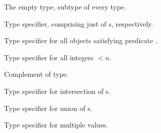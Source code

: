 \begin{LIST}{1cm}
  \IT{\NIL}
  {
  The empty type, subtype of every type.
  }

  {
  Type specifier, comprising just  of s, respectively.
  }

  {
  Type specifier for all objects satisfying predicate . 
  }

  {
  Type specifier for all integers $<n$.
  }

  {
  Complement of type.
  }

  {
  Type specifier for intersection of s.
  }

  {
  Type specifier for union of s.
  }

  {
  Type specifier for multiple values.
  }

  \end{LIST}


